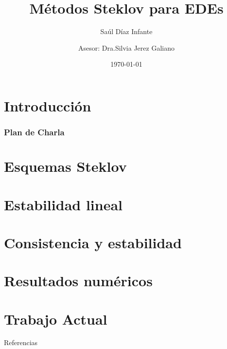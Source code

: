 \documentclass[spanish,10pt,xcolor=dvipsnames,table]{beamer}
\title{Métodos Steklov para EDEs }
\author[]{Sa\'ul D\'iaz Infante \and Asesor: Dra.Silvia Jerez Galiano}
\institute{CIMAT A.C.}
\date\today
\theoremstyle{plain} %
\theoremstyle{definition}
\begin{document}
  \frame{\titlepage \vspace{-0.5cm}}
 \section*{Introducci\'on}
 	
 	\begin{frame}
	\frametitle{Plan de Charla}
    \tableofcontents[pausesections]
\end{frame}
  \section{Esquemas Steklov}
   
  \section{Estabilidad lineal}
    
	
  \section{Consistencia y estabilidad}
	
	\section{Resultados numéricos}
  	
  \section{Trabajo Actual}
  	
\begin{frame}[allowframebreaks]{Referencias}
	
	
\end{frame}
%	
\end{document}
